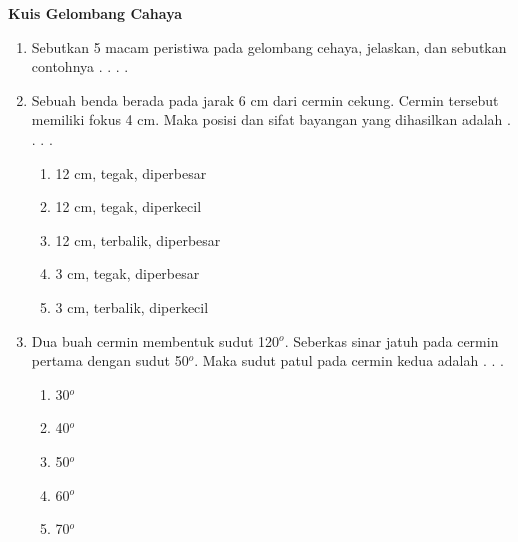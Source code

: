 \documentclass[11pt,a4paper]{extarticle}
\newcommand*\pilgan[1]{
\begin{enumerate}[label=\Alph*., itemsep=0pt,topsep=0pt,leftmargin=*,align=Center] #1 
\end{enumerate}}
\newcommand{\pilgani}[1]{                            \vspace{-0.3cm}\begin{multicols}{2}
 \begin{enumerate}[label=\Alph*., itemsep=0pt,topsep=0pt,leftmargin=*,align=Center]#1                     \end{enumerate}
 \phantom{ini cuma sapi, wedus, dan ayam}
 \end{multicols}}
\begin{document}
 \textbf{Kuis Gelombang Cahaya} \phantom{ini nama siswa yang aaamengerjakan soal kuis ini }  

\begin{multicols*}{2}

\begin{enumerate}
\item Sebutkan 5 macam peristiwa pada gelombang cehaya, jelaskan, dan sebutkan contohnya . . . .

\vspace{5cm}

\item Sebuah benda berada pada jarak 6 cm dari cermin cekung. Cermin tersebut memiliki fokus 4 cm. Maka posisi dan sifat bayangan yang dihasilkan adalah . . . .
\pilgan{
        \item 12 cm, tegak, diperbesar
        \item 12 cm, tegak, diperkecil
        \item 12 cm, terbalik, diperbesar
        \item 3 cm, tegak, diperbesar
        \item 3 cm, terbalik, diperkecil
        }

\item Dua buah cermin membentuk sudut 120$^o$. Seberkas sinar jatuh pada cermin pertama dengan sudut 50$^o$. Maka sudut patul pada cermin kedua adalah . . . 
\pilgani{
        \item 30$^o$
        \item 40$^o$
        \item 50$^o$
        \item 60$^o$
        \item 70$^o$
        }


\end{enumerate}
\end{multicols*}
\end{document}
